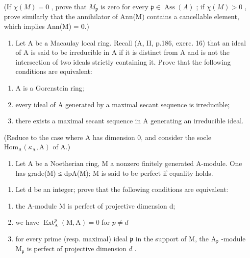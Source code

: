(If \(\chi(M) = 0\) , prove that \(M_{\mathfrak{p}}\) is zero for every \(\mathfrak{p} \in \operatorname{Ass}(A)\) ; if \(\chi(M) > 0\) , prove similarly that the annihilator of Ann(M) contains a cancellable element, which implies Ann(M) = 0.)

\begin{enumerate}
\def\labelenumi{\arabic{enumi})}
\setcounter{enumi}{2}
\tightlist
\item
  Let A be a Macaulay local ring. Recall (A, II, p.186, exerc. 16) that an ideal of A is said to be irreducible in A if it is distinct from A and is not the intersection of two ideals strictly containing it. Prove that the following conditions are equivalent:
\end{enumerate}

\begin{enumerate}
\def\labelenumi{(\roman{enumi})}
\item
  A is a Gorenstein ring;
\item
  every ideal of A generated by a maximal secant sequence is irreducible;
\item
  there exists a maximal secant sequence in A generating an irreducible ideal.
\end{enumerate}

(Reduce to the case where A has dimension 0, and consider the socle \(\mathrm{Hom}_{\mathrm{A}}(\kappa_{\mathrm{A}},\mathrm{A})\) of A.)

\begin{enumerate}
\def\labelenumi{\arabic{enumi})}
\setcounter{enumi}{3}
\tightlist
\item
  Let A be a Noetherian ring, M a nonzero finitely generated A-module. One has grade(M) ≤ dpA(M); M is said to be perfect if equality holds.
\end{enumerate}

\begin{enumerate}
\def\labelenumi{\alph{enumi})}
\tightlist
\item
  Let d be an integer; prove that the following conditions are equivalent:
\end{enumerate}

\begin{enumerate}
\def\labelenumi{(\roman{enumi})}
\item
  the A-module M is perfect of projective dimension d;
\item
  we have \(\operatorname{Ext}_{\mathrm{A}}^{p}(\mathrm{M},\mathrm{A}) = 0\) for \(p\neq d\)
\item
  for every prime (resp. maximal) ideal \(\mathfrak{p}\) in the support of M, the \(\mathrm{A}_{\mathfrak{p}}\) -module \(\mathrm{M}_{\mathfrak{p}}\) is perfect of projective dimension \(d\) .
\end{enumerate}


